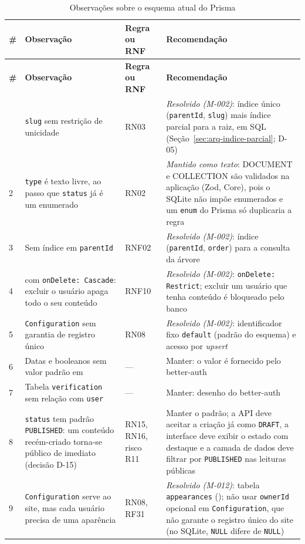 \begin{longtable}{@{}L{0.8cm}L{5.6cm}L{2.2cm}L{4.8cm}@{}}
\caption{Observações sobre o esquema atual do Prisma}\label{tab:obs-schema}\\
\toprule
\textbf{\#} & \textbf{Observação} & \textbf{Regra ou RNF} & \textbf{Recomendação}\\
\midrule
\endfirsthead
\toprule
\textbf{\#} & \textbf{Observação} & \textbf{Regra ou RNF} & \textbf{Recomendação}\\
\midrule
\endhead
\bottomrule
{} & \texttt{slug} sem restrição de unicidade & RN03 & \emph{Resolvido (M-002)}: índice único (\texttt{parentId}, \texttt{slug}) mais índice parcial para a raiz, em SQL (Seção~\ref{sec:arq-indice-parcial}; D-05)\\[1pt]
2 & \texttt{type} é texto livre, ao passo que \texttt{status} já é um enumerado & RN02 & \emph{Mantido como texto}: DOCUMENT e COLLECTION são validados na aplicação (Zod, Core), pois o SQLite não impõe enumerados e um \texttt{enum} do Prisma só duplicaria a regra\\[1pt]
3 & Sem índice em \texttt{parentId} & RNF02 & \emph{Resolvido (M-002)}: índice (\texttt{parentId}, \texttt{order}) para a consulta da árvore\\[1pt]
4 &  com \texttt{onDelete: Cascade}: excluir o usuário apaga todo o seu conteúdo & RNF10 & \emph{Resolvido (M-002)}: \texttt{onDelete: Restrict}; excluir um usuário que tenha conteúdo é bloqueado pelo banco\\[1pt]
5 & \texttt{Configuration} sem garantia de registro único & RN08 & \emph{Resolvido (M-002)}: identificador fixo \texttt{default} (padrão do esquema) e acesso por \emph{upsert}\\[1pt]
6 & Datas e booleanos sem valor padrão em  & --- & Manter: o valor é fornecido pelo better-auth\\[1pt]
7 & Tabela \texttt{verification} sem relação com \texttt{user} & --- & Manter: desenho do better-auth\\[1pt]
8 & \texttt{status} tem padrão \texttt{PUBLISHED}: um conteúdo recém-criado torna-se público de imediato (decisão D-15) & RN15, RN16, risco R11 & Manter o padrão; a API deve aceitar a criação já como \texttt{DRAFT}, a interface deve exibir o estado com destaque e a camada de dados deve filtrar por \texttt{PUBLISHED} nas leituras públicas\\[1pt]
9 & \texttt{Configuration} serve ao site, mas cada usuário precisa de uma aparência & RN08, RF31 & \emph{Resolvido (M-012)}: tabela \texttt{appearances} (); não usar \texttt{ownerId} opcional em \texttt{Configuration}, que não garante o registro único do site (no SQLite, \texttt{NULL} difere de \texttt{NULL})\\[1pt]

\end{longtable}
